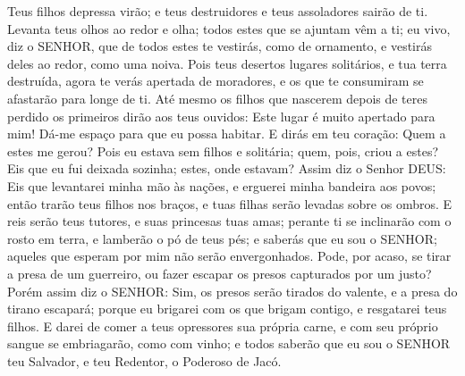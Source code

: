 {  Teus filhos depressa virão; e teus destruidores e teus assoladores sairão de ti.
  Levanta teus olhos ao redor e olha; todos estes que se ajuntam vêm a ti;
{} eu vivo, diz o SENHOR, que de todos estes te vestirás, como de ornamento, e vestirás deles ao
{} redor, como uma noiva.
  Pois
{} teus desertos
{} lugares solitários, e tua terra
{} destruída, agora te verás apertada de moradores, e os que te consumiram se afastarão para longe de ti.
  Até mesmo os filhos que nascerem depois de teres perdido os primeiros
 dirão aos teus ouvidos: Este lugar é muito apertado para mim! Dá-me espaço para que eu possa habitar.
  E dirás em teu coração: Quem a estes me gerou? Pois eu estava sem filhos e solitária; quem, pois,
{} criou a estes? Eis que eu fui deixada sozinha;
{} estes, onde estavam?
  Assim diz o Senhor DEUS: Eis que levantarei minha mão às nações, e erguerei minha bandeira aos povos; então trarão teus filhos nos braços, e tuas filhas serão levadas sobre os ombros.
  E reis serão teus tutores, e suas princesas
 tuas amas; perante ti se inclinarão com o rosto em terra, e lamberão o pó de teus pés; e saberás que eu sou o SENHOR; aqueles que esperam por mim não serão envergonhados.
  Pode, por acaso, se tirar a presa de um guerreiro, ou fazer escapar os presos capturados por um justo?
  Porém assim diz o SENHOR: Sim, os presos serão tirados do valente, e a presa do tirano escapará; porque eu brigarei com os que brigam contigo, e resgatarei teus filhos.
  E darei de comer a teus opressores sua própria carne, e com seu próprio sangue se embriagarão, como com vinho; e todos saberão que eu sou o SENHOR teu Salvador, e teu Redentor, o Poderoso de Jacó.
\par }

